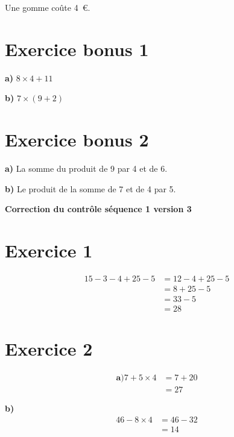 \documentclass[12pt]{extarticle}
\begin{document}
Une gomme coûte 4~€.

\section*{Exercice bonus 1}

\textbf{a)} $8 \times 4 + 11$

\textbf{b)} $7 \times (9 + 2)$

\section*{Exercice bonus 2}

\textbf{a)} La somme du produit de 9 par 4 et de 6.

\textbf{b)} Le produit de la somme de 7 et de 4 par 5.

\newpage

\begin{center}
\Large\textbf{Correction du contrôle séquence 1 version 3}
\end{center}

\section*{Exercice 1}
\begin{align*}
15 - 3 - 4 + 25 - 5 &= 12 - 4 + 25 - 5 \\
                     &= 8 + 25 - 5 \\
                     &= 33 - 5 \\
                     &= 28
\end{align*}

\section*{Exercice 2}

\begin{align*}
\textbf{a)}
7 + 5 \times 4 &= 7 + 20 \\
               &= 27
\end{align*}

\textbf{b)}
\begin{align*}
46 - 8 \times 4 &= 46 - 32 \\
                &= 14
\end{align*}
\end{document}
